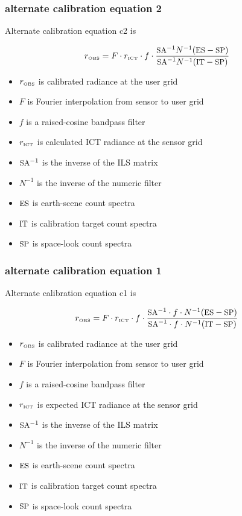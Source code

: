 \documentclass[11pt]{beamer}
\begin{document}
\begin{frame}
\frametitle{alternate calibration equation 2}

Alternate calibration equation c2 is

\[r_{\mbox{\tiny OBS}} = F \cdot r_{\mbox{\tiny ICT}}\cdot f \cdot
   \frac{\mbox{\small SA}^{-1}N^{-1}(\mbox{\small ES} - \mbox{\small SP})}{\mbox{\small SA}^{-1}N^{-1}(\mbox{\small IT} - \mbox{\small SP})} \]

\begin{itemize}
  \item $r_{\mbox{\tiny OBS}}$ is calibrated radiance at the user grid
  \item $F$ is Fourier interpolation from sensor to user grid
  \item $f$ is a raised-cosine bandpass filter
  \item $r_{\mbox{\tiny ICT}}$ is calculated ICT radiance at the sensor grid
  \item $\mbox{\small SA}^{-1}$ is the inverse of the ILS matrix
  \item $N^{-1}$ is the inverse of the numeric filter
  \item $\mbox{\small ES}$ is earth-scene count spectra
  \item $\mbox{\small IT}$ is calibration target count spectra
  \item $\mbox{\small SP}$ is space-look count spectra
\end{itemize}

\end{frame}
\begin{frame}
\frametitle{alternate calibration equation 1}

Alternate calibration equation c1 is

\[r_{\mbox{\tiny OBS}} = F \cdot r_{\mbox{\tiny ICT}}\cdot f \cdot
   \frac{\mbox{\small SA}^{-1}\cdot f \cdot N^{-1}(\mbox{\small ES} - \mbox{\small SP})}{\mbox{\small SA}^{-1}\cdot f \cdot N^{-1}(\mbox{\small IT} - \mbox{\small SP})} \]

\begin{itemize}
  \item $r_{\mbox{\tiny OBS}}$ is calibrated radiance at the user grid
  \item $F$ is Fourier interpolation from sensor to user grid
  \item $f$ is a raised-cosine bandpass filter
  \item $r_{\mbox{\tiny ICT}}$ is expected ICT radiance at the sensor grid
  \item $\mbox{\small SA}^{-1}$ is the inverse of the ILS matrix
  \item $N^{-1}$ is the inverse of the numeric filter
  \item $\mbox{\small ES}$ is earth-scene count spectra
  \item $\mbox{\small IT}$ is calibration target count spectra
  \item $\mbox{\small SP}$ is space-look count spectra
\end{itemize}

\end{frame}
\end{document}
